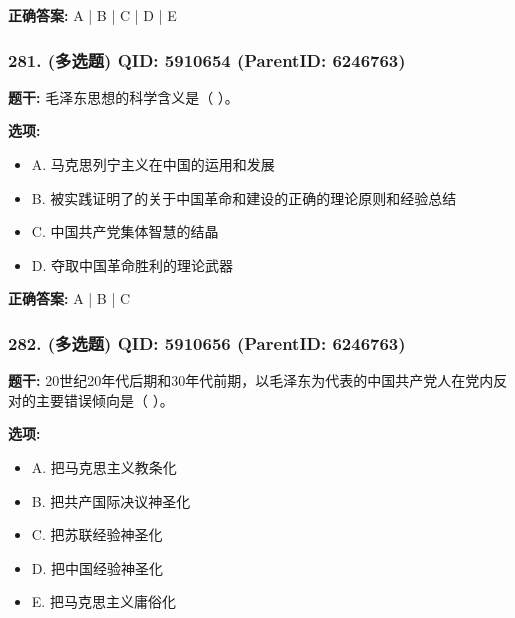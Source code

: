 \documentclass[12pt,UTF8]{ctexart}
\begin{document}
\textbf{正确答案:}
A | B | C | D | E

\vspace{0.3em}\hrulefill\vspace{0.7em}

\subsubsection*{281. (多选题) \small QID: 5910654 (ParentID: 6246763)}

\textbf{题干:}
毛泽东思想的科学含义是（ ）。



\textbf{选项:}
\begin{itemize}[leftmargin=*]

  \item A. 马克思列宁主义在中国的运用和发展

  \item B. 被实践证明了的关于中国革命和建设的正确的理论原则和经验总结

  \item C. 中国共产党集体智慧的结晶

  \item D. 夺取中国革命胜利的理论武器

\end{itemize}

\textbf{正确答案:}
A | B | C

\vspace{0.3em}\hrulefill\vspace{0.7em}

\subsubsection*{282. (多选题) \small QID: 5910656 (ParentID: 6246763)}

\textbf{题干:}
20世纪20年代后期和30年代前期，以毛泽东为代表的中国共产党人在党内反对的主要错误倾向是（ ）。



\textbf{选项:}
\begin{itemize}[leftmargin=*]

  \item A. 把马克思主义教条化

  \item B. 把共产国际决议神圣化

  \item C. 把苏联经验神圣化

  \item D. 把中国经验神圣化

  \item E. 把马克思主义庸俗化

\end{itemize}
\end{document}
